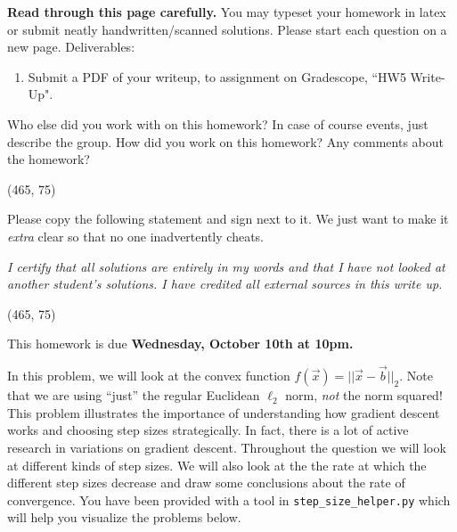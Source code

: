 \documentclass[11pt]{article}
\begin{document}
\fontsize{12}{15}\selectfont


\textbf{Read through this page carefully.} You may typeset your homework in latex or submit neatly handwritten/scanned solutions. Please start each question on a new page. Deliverables:

\begin{enumerate}
  \item Submit a PDF of your writeup, 
  to assignment on Gradescope, ``HW5 Write-Up". 
\end{enumerate}


\begin{Parts}

\Part Who else did you work with on this homework? In case of course events, just describe the group. How did you work on this homework? Any comments about the homework?

\vspace{15pt}
\framebox(465, 75){}

\Part Please copy the following statement and sign next to it. We just want to make it \textit{extra} clear so that no one inadvertently cheats.

\textit{I certify that all solutions are entirely in my words and that I have not looked at another student's solutions. I have credited all external sources in this write up.}

\vspace{15pt}
\framebox(465, 75){}

\end{Parts}

\pagebreak

This homework is due \textbf{Wednesday, October 10th at 10pm.}


In this problem, we will look at the convex function $f(\vec x) = ||\vec x-\vec b||_2$. Note that we are using ``just'' the regular
Euclidean $\ell_2$ norm, \emph{not} the norm squared! This problem illustrates
the importance of understanding how gradient descent works and choosing step
sizes strategically. In fact, there is a lot of active research in variations on
gradient descent.
Throughout the question we will look at different kinds of step sizes. We will also look at the the rate at which the different step sizes decrease and draw some conclusions about the rate of convergence.
 You have been provided with a tool in \texttt{step\_size\_helper.py} which will help you
visualize the problems below.
\end{document}
